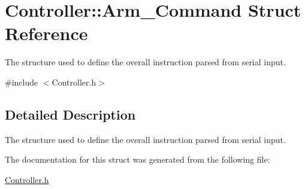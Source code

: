 \hypertarget{struct_controller_1_1_arm___command}{}\section{Controller\+:\+:Arm\+\_\+\+Command Struct Reference}
\label{struct_controller_1_1_arm___command}


The structure used to define the overall instruction parsed from serial input.  




{\ttfamily \#include $<$Controller.\+h$>$}



\subsection{Detailed Description}
The structure used to define the overall instruction parsed from serial input. 

The documentation for this struct was generated from the following file\+:\begin{DoxyCompactItemize}
\item 
\hyperlink{_controller_8h}{Controller.\+h}\end{DoxyCompactItemize}
